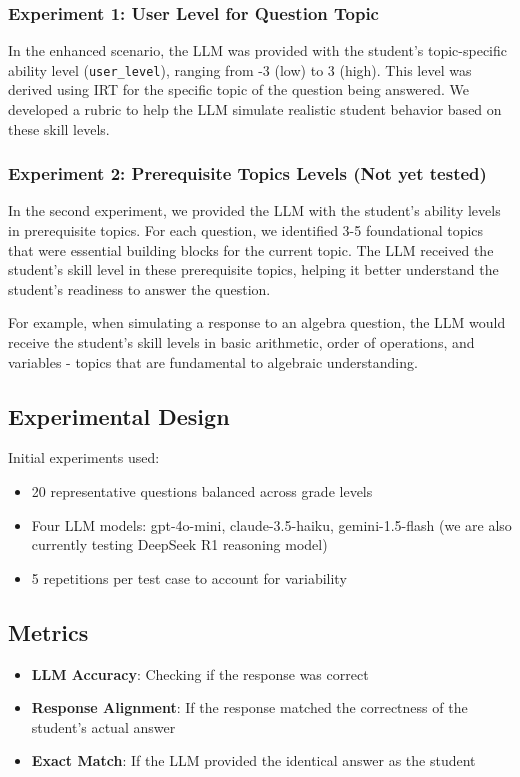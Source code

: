 \documentclass[
    a4paper, %
    10pt, %
    twoside %
]{LTJournalArticle}
\begin{document}
\subsubsection{Experiment 1: User Level for Question Topic}
In the enhanced scenario, the LLM was provided with the student's topic-specific ability level (\texttt{user\_level}), ranging from -3 (low) to 3 (high). This level was derived using IRT for the specific topic of the question being answered. We developed a rubric to help the LLM simulate realistic student behavior based on these skill levels.

\subsubsection{Experiment 2: Prerequisite Topics Levels (Not yet tested)}
In the second experiment, we provided the LLM with the student's ability levels in prerequisite topics. For each question, we identified 3-5 foundational topics that were essential building blocks for the current topic. The LLM received the student's skill level in these prerequisite topics, helping it better understand the student's readiness to answer the question.

For example, when simulating a response to an algebra question, the LLM would receive the student's skill levels in basic arithmetic, order of operations, and variables - topics that are fundamental to algebraic understanding.


\subsection{Experimental Design}
Initial experiments used:
\begin{itemize}
    \item 20 representative questions balanced across grade levels
    \item Four LLM models: gpt-4o-mini, claude-3.5-haiku, gemini-1.5-flash (we are also currently testing DeepSeek R1 reasoning model)
    \item 5 repetitions per test case to account for variability
\end{itemize}

\subsection{Metrics}
\begin{itemize}
    \item \textbf{LLM Accuracy}: Checking if the response was correct
    \item \textbf{Response Alignment}: If the response matched the correctness of the student's actual answer
    \item \textbf{Exact Match}: If the LLM provided the identical answer as the student
\end{itemize}
\end{document}
